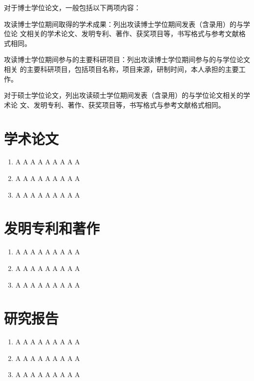 
\cleardoublepage
\begin{publications}

对于博士学位论文，一般包括以下两项内容：

攻读博士学位期间取得的学术成果：列出攻读博士学位期间发表（含录用）的与学位论
文相关的学术论文、发明专利、著作、获奖项目等，书写格式与参考文献格式相同。

攻读博士学位期间参与的主要科研项目：列出攻读博士学位期间参与的与学位论文相关
的主要科研项目，包括项目名称，项目来源，研制时间，本人承担的主要工作。

对于硕士学位论文，列出攻读硕士学位期间发表（含录用）的与学位论文相关的学术论
文、发明专利、著作、获奖项目等，书写格式与参考文献格式相同。

\section*{学术论文}

\begin{enumerate}
\item A A A A A A A A A
\item A A A A A A A A A
\item A A A A A A A A A
\end{enumerate}

\section*{发明专利和著作}

\begin{enumerate}
\item A A A A A A A A A
\item A A A A A A A A A
\item A A A A A A A A A
\end{enumerate}

\section*{研究报告}
\begin{enumerate}
\item A A A A A A A A A
\item A A A A A A A A A
\item A A A A A A A A A
\end{enumerate}

\end{publications}

